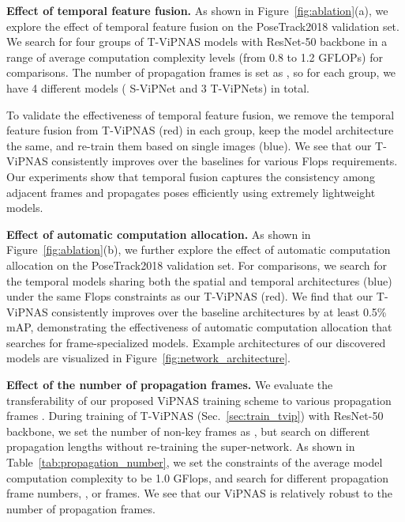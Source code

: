 \documentclass[final]{cvpr}
\begin{document}
\textbf{Effect of temporal feature fusion.}
As shown in Figure~\ref{fig:ablation}(a), we explore the effect of temporal feature fusion on the PoseTrack2018 validation set. We search for four groups of T-ViPNAS models with ResNet-50 backbone in a range of average computation complexity levels (from 0.8 to 1.2 GFLOPs) for comparisons. The number of propagation frames is set as , so for each group, we have 4 different models ( S-ViPNet and 3 T-ViPNets) in total.

To validate the effectiveness of temporal feature fusion, we remove the temporal feature fusion from T-ViPNAS (red) in each group, keep the model architecture the same, and re-train them based on single images (blue). We see that our T-ViPNAS consistently improves over the baselines for various Flops requirements. Our experiments show that temporal fusion captures the consistency among adjacent frames and propagates poses efficiently using extremely lightweight models.


\textbf{Effect of automatic computation allocation.} 
As shown in Figure~\ref{fig:ablation}(b), we further explore the effect of automatic computation allocation on the PoseTrack2018 validation set. For comparisons, we search for the temporal models sharing both the spatial and temporal architectures (blue) under the same Flops constraints as our T-ViPNAS (red). We find that our T-ViPNAS consistently improves over the baseline architectures by at least 0.5\% mAP, demonstrating the effectiveness of automatic computation allocation that searches for frame-specialized models. Example architectures of our discovered models are visualized in Figure~\ref{fig:network_architecture}. 

\textbf{Effect of the number of propagation frames.} We evaluate the transferability of our proposed ViPNAS training scheme to various propagation frames . During training of T-ViPNAS (Sec.~\ref{sec:train_tvip}) with ResNet-50 backbone, we set the number of non-key frames as , but search on different propagation lengths without re-training the super-network. As shown in Table~\ref{tab:propagation_number}, we set the constraints of the average model computation complexity to be 1.0 GFlops, and search for different propagation frame numbers, \ie ,  or  frames. We see that our ViPNAS is relatively robust to the number of propagation frames.
\end{document}
